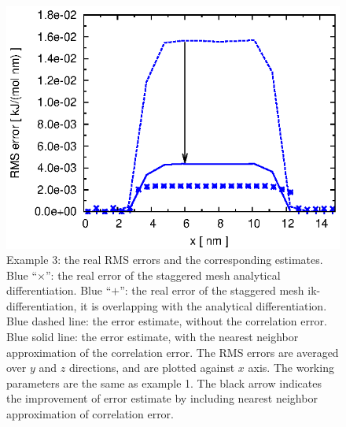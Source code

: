 \documentclass[aps,pre,preprint,unsortedaddress]{revtex4}
\begin{document}
\begin{figure}
  \centering
  \includegraphics[]{fig.new//fig.water.ana.st.error.eps}
  \caption{
    Example 3: the real RMS errors and the corresponding
    estimates. 
    Blue ``$\times$'': the real error of the staggered mesh
    analytical differentiation.
    Blue ``$+$'': the real error of the staggered mesh
    ik-differentiation, it is overlapping with the analytical differentiation.
    Blue dashed line: the error estimate, without the correlation error.
    Blue solid line: the error estimate, with the nearest
    neighbor approximation of the correlation error.
    The RMS errors are averaged over $y$ and $z$ directions, and are
    plotted against $x$ axis.
    The working parameters are the same as example 1.
    The black arrow indicates the improvement
    of error estimate by including nearest neighbor
    approximation of correlation error.
  }   
  \label{fig:water-error}
\end{figure}
\end{document}
